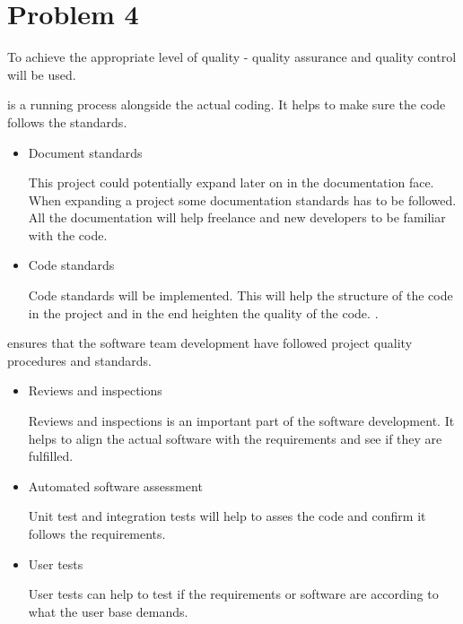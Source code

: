 \chapter{Problem 4}
To achieve the appropriate level of quality - quality assurance and quality control will be used.
\begin{description}[align=left]
	\setlength\itemsep{0.1em}
	\item[Quality assurance] is a running process alongside the actual coding. It helps to make sure the code follows the standards.
	\begin{itemize}
		\item Document standards
		
			This project could potentially expand later on in the documentation face. When expanding a project some documentation standards has to be followed. All the documentation will help freelance and new developers to be familiar with the code.  
		\item Code standards
		
			Code standards will be implemented. This will help the structure of the code in the project and in the end heighten the quality of the code.
			. 
	\end{itemize}
	\item[Quality control] ensures that the software team development have followed project quality procedures and standards.
	\begin{itemize}
		\item Reviews and inspections
		
			Reviews and inspections is an important part of the software development. It helps to align the actual software with the requirements and see if they are fulfilled.
		\item Automated software assessment
		
			Unit test and integration tests will help to asses the code and confirm it follows the requirements. 
		\item User tests
			
			User tests can help to test if the requirements or software are according to what the user base demands. 
	\end{itemize}
\end{description}